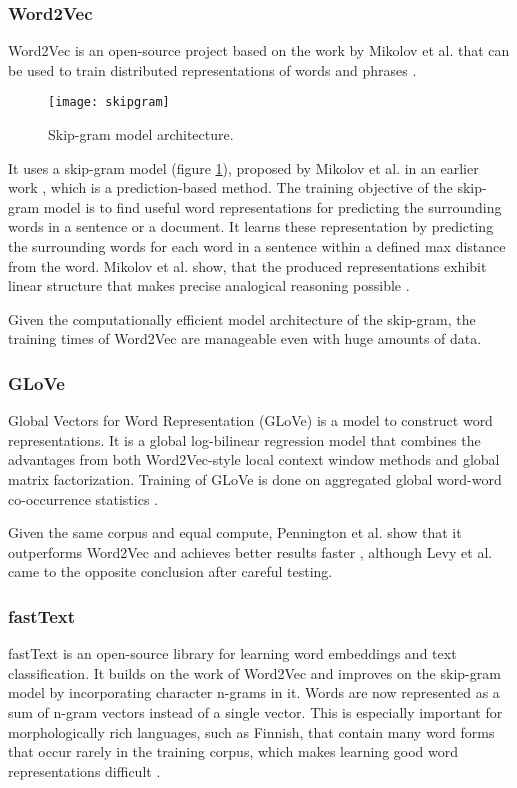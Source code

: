 \subsubsection{Word2Vec} \label{Word2Vec}
Word2Vec is an open-source project based on the work by Mikolov et al. that can be used to train distributed representations of words and phrases \cite{mikolov2013}.

\begin{figure}[t]
\texttt{[image: skipgram]}
\centering
\caption{Skip-gram model architecture.}
\label{fig:skipgram}
\end{figure}

It uses a skip-gram model (figure \ref{fig:skipgram}), proposed by Mikolov et al. in an earlier work \cite{mikolov2013a}, which is a prediction-based method.
The training objective of the skip-gram model is to find useful word representations for predicting the surrounding words in a sentence or a document.
It learns these representation by predicting the surrounding words for each word in a sentence within a defined max distance from the word.
Mikolov et al. show, that the produced representations exhibit linear structure that makes precise analogical reasoning possible \cite{mikolov2013}.

Given the computationally efficient model architecture of the skip-gram, the training times of Word2Vec are manageable even with huge amounts of data.

\subsubsection{GLoVe} \label{GLoVe}
Global Vectors for Word Representation (GLoVe) is a model to construct word representations.
It is a global log-bilinear regression model that combines the advantages from both Word2Vec-style local context window methods and global matrix factorization.
Training of GLoVe is done on aggregated global word-word co-occurrence statistics \cite{pennington2014}.

Given the same corpus and equal compute, Pennington et al. show that it outperforms Word2Vec and achieves better results faster \cite{pennington2014}, although Levy et al. \cite{levy2015} came to the opposite conclusion after careful testing.

\subsubsection{fastText} \label{fastText}
fastText is an open-source library for learning word embeddings and text classification.
It builds on the work of Word2Vec and improves on the skip-gram model by incorporating character n-grams in it.
Words are now represented as a sum of n-gram vectors instead of a single vector.
This is especially important for morphologically rich languages, such as Finnish, that contain many word forms that occur rarely in the training corpus, which makes learning good word representations difficult \cite{bojanowski2017}.

